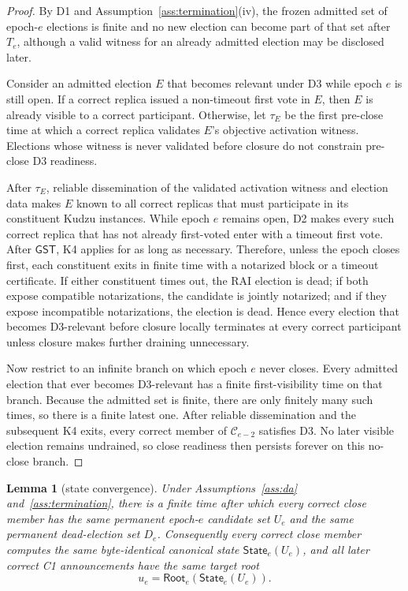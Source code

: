 \documentclass[11pt]{article}
\newtheorem{lemma}[theorem]{Lemma}
\theoremstyle{definition}
\theoremstyle{remark}
\newcommand{\C}{\mathcal C}
\newcommand{\GST}{\mathsf{GST}}
\newcommand{\Root}{\mathsf{Root}}
\newcommand{\State}{\mathsf{State}}
\begin{document}
\begin{proof}
By D1 and Assumption~\ref{ass:termination}(iv), the frozen admitted set of epoch-$e$ elections is finite and no new election can become part of that set after $T_e$, although a valid witness for an already admitted election may be disclosed later.

Consider an admitted election $E$ that becomes relevant under D3 while epoch $e$ is still open. If a correct replica issued a non-timeout first vote in $E$, then $E$ is already visible to a correct participant. Otherwise, let $\tau_E$ be the first pre-close time at which a correct replica validates $E$'s objective activation witness. Elections whose witness is never validated before closure do not constrain pre-close D3 readiness.

After $\tau_E$, reliable dissemination of the validated activation witness and election data makes $E$ known to all correct replicas that must participate in its constituent Kudzu instances. While epoch $e$ remains open, D2 makes every such correct replica that has not already first-voted enter with a timeout first vote. After $\GST$, K4 applies for as long as necessary. Therefore, unless the epoch closes first, each constituent exits in finite time with a notarized block or a timeout certificate. If either constituent times out, the RAI election is dead; if both expose compatible notarizations, the candidate is jointly notarized; and if they expose incompatible notarizations, the election is dead. Hence every election that becomes D3-relevant before closure locally terminates at every correct participant unless closure makes further draining unnecessary.

Now restrict to an infinite branch on which epoch $e$ never closes. Every admitted election that ever becomes D3-relevant has a finite first-visibility time on that branch. Because the admitted set is finite, there are only finitely many such times, so there is a finite latest one. After reliable dissemination and the subsequent K4 exits, every correct member of $\C_{e-2}$ satisfies D3. No later visible election remains undrained, so close readiness then persists forever on this no-close branch.
\end{proof}

\begin{lemma}[state convergence]
\label{lem:state-convergence}
Under Assumptions~\ref{ass:da} and~\ref{ass:termination}, there is a finite time after which every correct close member has the same permanent epoch-$e$ candidate set $U_e$ and the same permanent dead-election set $D_e$. Consequently every correct close member computes the same byte-identical canonical state $\State_e(U_e)$, and all later correct C1 announcements have the same target root
\[
  u_e=\Root_e(\State_e(U_e)).
\]
\end{lemma}
\end{document}
